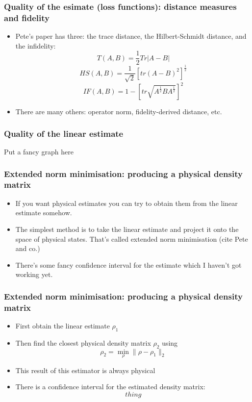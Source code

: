 \documentclass{beamer}
\begin{document}
\begin{frame}
  \frametitle{Quality of the esimate (loss functions): distance measures and fidelity}
  \begin{itemize}
  \item{
      Pete's paper has three: the trace distance, the Hilbert-Schmidt distance, and the infidelity:
      \begin{equation}T(A,B) = \frac{1}{2} Tr|A - B|\end{equation}
      \begin{equation}HS(A,B) = \frac{1}{\sqrt{2}} \left[tr(A - B)^2\right]^{\frac{1}{2}}\end{equation}
      \begin{equation}IF(A,B) = 1 - \left[tr\sqrt{A^{\frac{1}{2}}BA^{\frac{1}{2}}}\right]^2\end{equation}
    }
  \item{There are many others: operator norm, fidelity-derived distance, etc.}
  \end{itemize}
\end{frame}

\begin{frame}
  \frametitle{Quality of the linear estimate}
  Put a fancy graph here
\end{frame}

\begin{frame}
  \frametitle{Extended norm minimisation: producing a physical density matrix}
  \begin{itemize}
  \item If you want physical estimates you can try to obtain them from the linear estimate somehow.
  \item The simplest method is to take the linear estimate and project it onto the space of physical states. That's called extended norm minimisation (cite Pete and co.)
  \item There's some fancy confidence interval for the estimate which I haven't got working yet.
  \end{itemize}
\end{frame}

\begin{frame}
  \frametitle{Extended norm minimisation: producing a physical density matrix}
  \begin{itemize}
  \item First obtain the linear estimate $\rho_1$
  \item Then find the closest physical density matrix $\rho_2$ using $$\rho_2 = \min_{\rho} \lVert \rho - \rho_1\rVert_2$$
  \item This result of this estimator is always physical
  \item There is a confidence interval for the estimated density matrix: $$thing$$ 
  \end{itemize}
\end{frame}
\end{document}

